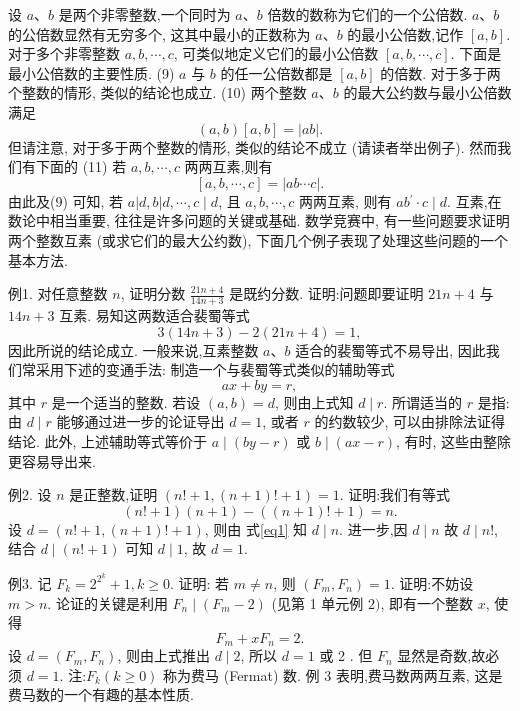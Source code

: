 设 $a 、 b$ 是两个非零整数,一个同时为 $a 、 b$ 倍数的数称为它们的一个公倍数.
$a 、 b$ 的公倍数显然有无穷多个, 这其中最小的正数称为 $a 、 b$ 的最小公倍数,记作 $[a, b]$. 对于多个非零整数 $a, b, \cdots, c$, 可类似地定义它们的最小公倍数 $[a, b, \cdots, c]$.
下面是最小公倍数的主要性质.
(9) $a$ 与 $b$ 的任一公倍数都是 $[a, b]$ 的倍数.
对于多于两个整数的情形, 类似的结论也成立.
(10) 两个整数 $a 、 b$ 的最大公约数与最小公倍数满足
$$
(a, b)[a, b]=|a b| .
$$
但请注意, 对于多于两个整数的情形, 类似的结论不成立 (请读者举出例子). 然而我们有下面的
(11) 若 $a, b, \cdots, c$ 两两互素,则有
$$
[a, b, \cdots, c]=|a b \cdots c| .
$$
由此及(9) 可知, 若 $a|d, b| d, \cdots, c \mid d$, 且 $a, b, \cdots, c$ 两两互素, 则有 $a b{ }^{\prime} \cdot c \mid d$.
互素,在数论中相当重要, 往往是许多问题的关键或基础.
数学竞赛中, 有一些问题要求证明两个整数互素 (或求它们的最大公约数), 下面几个例子表现了处理这些问题的一个基本方法.



例1. 对任意整数 $n$, 证明分数 $\frac{21 n+4}{14 n+3}$ 是既约分数.
证明:问题即要证明 $21 n+4$ 与 $14 n+3$ 互素.
易知这两数适合裴蜀等式
$$
3(14 n+3)-2(21 n+4)=1,
$$
因此所说的结论成立.
一般来说,互素整数 $a 、 b$ 适合的裴蜀等式不易导出, 因此我们常采用下述的变通手法: 制造一个与裴蜀等式类似的辅助等式
$$
a x+b y=r,
$$
其中 $r$ 是一个适当的整数.
若设 $(a, b)=d$, 则由上式知 $d \mid r$. 所谓适当的 $r$ 是指: 由 $d \mid r$ 能够通过进一步的论证导出 $d=1$, 或者 $r$ 的约数较少, 可以由排除法证得结论.
此外, 上述辅助等式等价于 $a \mid(b y-r)$ 或 $b \mid(a x-r)$, 有时, 这些由整除更容易导出来.



例2. 设 $n$ 是正整数,证明 $(n !+1,(n+1) !+1)=1$.
证明:我们有等式
$$
(n !+1)(n+1)-((n+1) !+1)=n . \label{eq1}
$$
设 $d=(n !+1,(n+1) !+1)$, 则由 式\ref{eq1} 知 $d \mid n$.
进一步,因 $d \mid n$ 故 $d \mid n !$, 结合 $d \mid(n !+1)$ 可知 $d \mid 1$, 故 $d=1$.



例3. 记 $F_k=2^{2^k}+1, k \geqslant 0$. 证明: 若 $m \neq n$, 则 $\left(F_m, F_n\right)=1$.
证明:不妨设 $m>n$. 论证的关键是利用 $F_n \mid\left(F_m-2\right)$ (见第 1 单元例 $2)$, 即有一个整数 $x$, 使得
$$
F_m+x F_n=2 .
$$
设 $d=\left(F_m, F_n\right)$, 则由上式推出 $d \mid 2$, 所以 $d=1$ 或 2 . 但 $F_n$ 显然是奇数,故必须 $d=1$.
注:$F_k(k \geqslant 0)$ 称为费马 (Fermat) 数.
例 3 表明,费马数两两互素, 这是费马数的一个有趣的基本性质.



